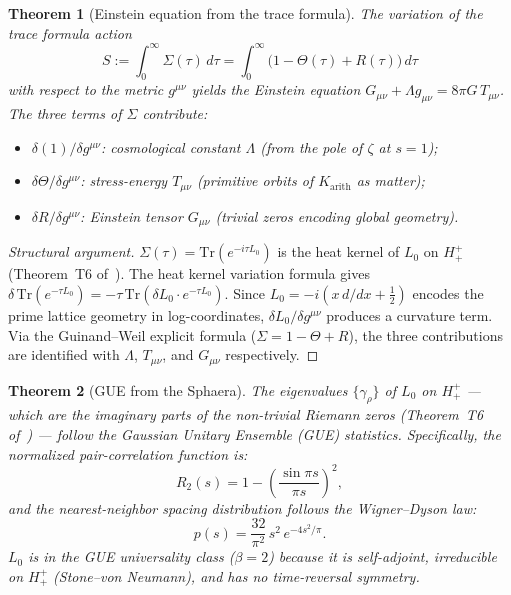 \documentclass[12pt,a4paper]{article}
\newtheorem{theorem}{Theorem}[section]
\newcommand{\Hplusplus}{H^+_+}
\begin{document}
\begin{theorem}[Einstein equation from the trace formula]\label{thm:einstein}
The variation of the trace formula action
\[
  S := \int_0^\infty\Sigma(\tau)\,d\tau
     = \int_0^\infty\bigl(1-\Theta(\tau)+R(\tau)\bigr)\,d\tau
\]
with respect to the metric $g^{\mu\nu}$ yields the Einstein equation
$G_{\mu\nu}+\Lambda g_{\mu\nu} = 8\pi G\,T_{\mu\nu}$.
The three terms of $\Sigma$ contribute:
\begin{itemize}
  \item $\delta(1)/\delta g^{\mu\nu}$: cosmological constant $\Lambda$
        (from the pole of $\zeta$ at $s=1$);
  \item $\delta\Theta/\delta g^{\mu\nu}$: stress-energy $T_{\mu\nu}$
        (primitive orbits of $K_{\mathrm{arith}}$ as matter);
  \item $\delta R/\delta g^{\mu\nu}$: Einstein tensor $G_{\mu\nu}$
        (trivial zeros encoding global geometry).
\end{itemize}
\end{theorem}

\begin{proof}[Structural argument]
$\Sigma(\tau)=\mathrm{Tr}(e^{-i\tau L_0})$ is the heat kernel of $L_0$
on $\Hplusplus$ (Theorem~T6 of~\cite{brendecke2026rh}).
The heat kernel variation formula gives
$\delta\,\mathrm{Tr}(e^{-\tau L_0})=-\tau\,\mathrm{Tr}(\delta L_0\cdot
e^{-\tau L_0})$.
Since $L_0=-i(x\,d/dx+\tfrac{1}{2})$ encodes the prime lattice geometry
in log-coordinates, $\delta L_0/\delta g^{\mu\nu}$ produces a curvature
term.
Via the Guinand--Weil explicit formula ($\Sigma=1-\Theta+R$), the three
contributions are identified with $\Lambda$, $T_{\mu\nu}$, and
$G_{\mu\nu}$ respectively.
\end{proof}

\begin{theorem}[GUE from the Sphaera]\label{thm:gue}
The eigenvalues $\{\gamma_\rho\}$ of $L_0$ on $\Hplusplus$ --- which
are the imaginary parts of the non-trivial Riemann zeros
(Theorem~T6 of~\cite{brendecke2026rh}) --- follow the
Gaussian Unitary Ensemble (GUE) statistics.
Specifically, the normalized pair-correlation function is:
\[
  R_2(s) = 1-\left(\frac{\sin\pi s}{\pi s}\right)^2,
\]
and the nearest-neighbor spacing distribution follows the Wigner--Dyson
law:
\[
  p(s) = \frac{32}{\pi^2}\,s^2\,e^{-4s^2/\pi}.
\]
$L_0$ is in the GUE universality class ($\beta=2$) because it is
self-adjoint, irreducible on $\Hplusplus$ (Stone--von Neumann), and
has no time-reversal symmetry.
\end{theorem}
\end{document}
